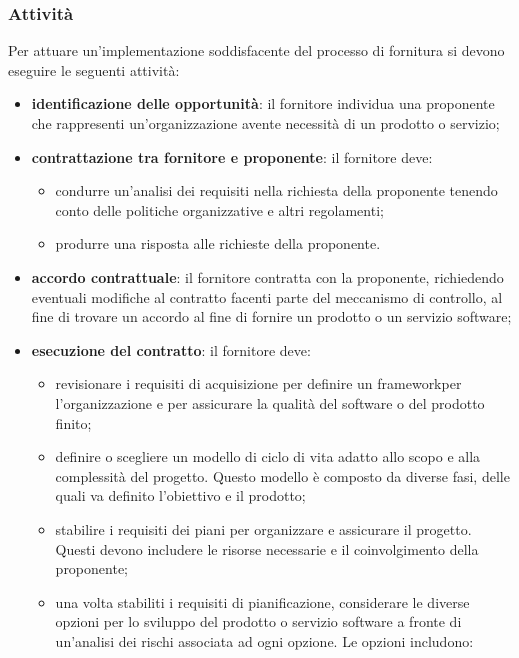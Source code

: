 	\subsubsection{Attività}
	Per attuare un'implementazione soddisfacente del processo di fornitura si devono eseguire le seguenti attività:
\begin{itemize}
\item \textbf{identificazione delle opportunità}: il fornitore individua una proponente che rappresenti un'organizzazione avente necessità di un prodotto o servizio;
\item \textbf{contrattazione tra fornitore e proponente}: il fornitore deve:
\begin{itemize}
\item condurre un'analisi dei requisiti nella richiesta della proponente tenendo conto delle politiche organizzative e altri regolamenti;

\item produrre una risposta alle richieste della proponente.
\end{itemize}

\item \textbf{accordo contrattuale}: il fornitore contratta con la proponente, richiedendo eventuali modifiche al contratto facenti parte del meccanismo di controllo, al fine di trovare un accordo al fine di fornire un prodotto o un servizio software;

\item \textbf{esecuzione del contratto}: il fornitore deve:
\begin{itemize}
\item revisionare i requisiti di acquisizione per definire un framework\glosp per l'organizzazione e per assicurare la qualità del software o del prodotto finito;

\item definire o scegliere un modello di ciclo di vita adatto allo scopo e alla complessità del progetto. Questo modello è composto da diverse fasi, delle quali va definito l'obiettivo e il prodotto;

\item stabilire i requisiti dei piani per organizzare e assicurare il progetto. Questi devono includere le risorse necessarie e il coinvolgimento della proponente;

\item una volta stabiliti i requisiti di pianificazione, considerare le diverse opzioni per lo sviluppo del prodotto o servizio software a fronte di un'analisi dei rischi associata ad ogni opzione. Le opzioni includono:


\end{itemize}
\end{itemize}
